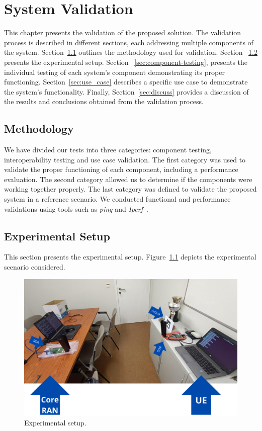 \chapter{System Validation}\label{ch:validation}

This chapter presents the validation of the proposed solution.
The validation process is described in different sections, each addressing multiple components of the system.
Section~\ref{sec:meth} outlines the methodology used for validation.
Section ~\ref{sec:experimental-setup} presents the experimental setup.
Section ~\ref{sec:component-testing}, presents the individual testing of each system's component demonstrating its proper functioning.
Section~\ref{sec:use_case} describes a specific use case to demonstrate the system's functionality.
Finally, Section~\ref{sec:discuss} provides a discussion of the results and conclusions obtained from the validation process.

\section{Methodology}\label{sec:meth}
We have divided our tests into three categories: component testing, interoperability testing and use case validation.
The first category was used to validate the proper functioning of each component, including a performance evaluation.
The second category allowed us to determine if the components were working together properly.
The last category was defined to validate the proposed system in a reference scenario.
We conducted functional and performance validations using tools such as \emph{ping} and \emph{Iperf}~\cite{iperf}.

\section{Experimental Setup}\label{sec:experimental-setup}
This section presents the experimental setup.
Figure~\ref{fig:setup} depicts the experimental scenario considered.

\begin{figure}[H]
    \centering
    \includegraphics[width=\linewidth]{figures/setup}
    \caption{Experimental setup.}
    \label{fig:setup}
\end{figure}

